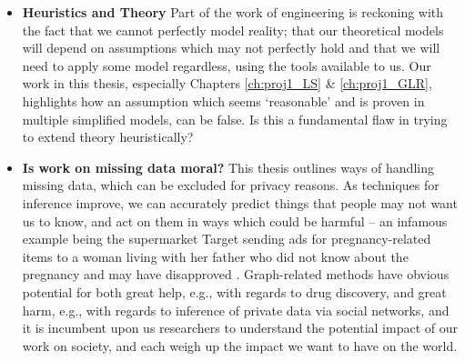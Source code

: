 \begin{itemize}
    \item \textbf{Heuristics and Theory} Part of the work of engineering is reckoning with the fact that we cannot perfectly model reality; that our theoretical models will depend on assumptions which may not perfectly hold and that we will need to apply some model regardless, using the tools available to us.
    Our work in this thesis, especially Chapters \ref{ch:proj1_LS} \& \ref{ch:proj1_GLR}, highlights how an assumption which seems `reasonable' and is proven in multiple simplified models, can be false. Is this a fundamental flaw in trying to extend theory heuristically? 
    \item \textbf{Is work on missing data moral?} This thesis outlines ways of handling missing data, which can be excluded for privacy reasons. As techniques for inference improve, we can accurately predict things that people may not want us to know, and act on them in ways which could be harmful -- an infamous example being the supermarket Target sending ads for pregnancy-related items to a woman living with her father who did not know about the pregnancy and may have disapproved \cite{charles2015companies}. Graph-related methods have obvious potential for both great help, e.g., with regards to drug discovery, and great harm, e.g., with regards to inference of private data via social networks, and it is incumbent upon us researchers to understand the potential impact of our work on society, and each weigh up the impact we want to have on the world.
\end{itemize}